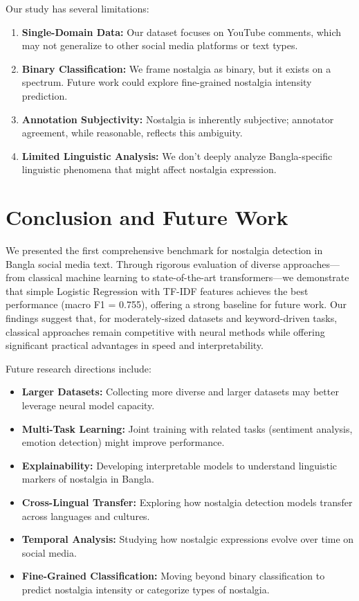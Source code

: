 \documentclass[conference]{IEEEtran}
\begin{document}
Our study has several limitations:
\begin{enumerate}
\item \textbf{Single-Domain Data:} Our dataset focuses on YouTube comments, which may not generalize to other social media platforms or text types.
\item \textbf{Binary Classification:} We frame nostalgia as binary, but it exists on a spectrum. Future work could explore fine-grained nostalgia intensity prediction.
\item \textbf{Annotation Subjectivity:} Nostalgia is inherently subjective; annotator agreement, while reasonable, reflects this ambiguity.
\item \textbf{Limited Linguistic Analysis:} We don't deeply analyze Bangla-specific linguistic phenomena that might affect nostalgia expression.
\end{enumerate}

\section{Conclusion and Future Work}

We presented the first comprehensive benchmark for nostalgia detection in Bangla social media text. Through rigorous evaluation of diverse approaches—from classical machine learning to state-of-the-art transformers—we demonstrate that simple Logistic Regression with TF-IDF features achieves the best performance (macro F1 = 0.755), offering a strong baseline for future work. Our findings suggest that, for moderately-sized datasets and keyword-driven tasks, classical approaches remain competitive with neural methods while offering significant practical advantages in speed and interpretability.

Future research directions include:
\begin{itemize}
\item \textbf{Larger Datasets:} Collecting more diverse and larger datasets may better leverage neural model capacity.
\item \textbf{Multi-Task Learning:} Joint training with related tasks (sentiment analysis, emotion detection) might improve performance.
\item \textbf{Explainability:} Developing interpretable models to understand linguistic markers of nostalgia in Bangla.
\item \textbf{Cross-Lingual Transfer:} Exploring how nostalgia detection models transfer across languages and cultures.
\item \textbf{Temporal Analysis:} Studying how nostalgic expressions evolve over time on social media.
\item \textbf{Fine-Grained Classification:} Moving beyond binary classification to predict nostalgia intensity or categorize types of nostalgia.
\end{itemize}
\end{document}
